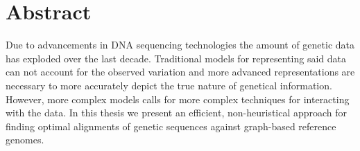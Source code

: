 \documentclass[thesis.tex]{subfiles}
\begin{document}
\chapter*{Abstract}
Due to advancements in DNA sequencing technologies the amount of genetic data has exploded over the last decade. Traditional models for representing said data can not account for the observed variation and more advanced representations are necessary to more accurately depict the true nature of genetical information. However, more complex models calls for more complex techniques for interacting with the data. In this thesis we present an efficient, non-heuristical approach for finding optimal alignments of genetic sequences against graph-based reference genomes.
\end{document}
